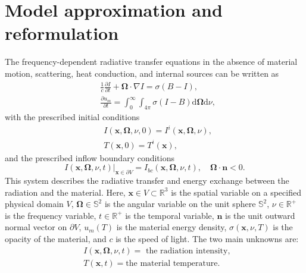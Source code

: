 \documentclass[preprint,12pt]{elsarticle}
\theoremstyle{definition}
\theoremstyle{plain}
\numberwithin{equation}{section}
\numberwithin{algorithm}{section}
\newcounter{eq_count}
\newcounter{subeq_count}
\newcounter{thm_count}
\newcounter{fig_count}
\newcounter{tab_count}
\newcounter{alg_count}
\let\OldSection\section
\renewcommand{\section}{
    \setcounter{eq_count}{0}
    \setcounter{thm_count}{0}
    \setcounter{fig_count}{0}
    \setcounter{tab_count}{0}
    \setcounter{alg_count}{0}
    \OldSection
}
\newcommand{\vOmega}{\mathbf{\Omega}}
\newcommand{\vx}{\mathbf{x}}
\newcommand{\dd}{{\text{d}}}
\newcommand{\pdrv}[2]{\frac{\partial{#1}}{\partial{#2}}}
\begin{document}
\section{Model approximation and reformulation}
\label{sec:model}
The frequency-dependent radiative transfer equations in the absence of material motion, scattering, heat conduction, and internal sources can be written as \cite{larsen2013properties}
\begin{subequations} \label{eq_RTE}
    \begin{align}
        \label{eq:simplified_transfer_intensity}
		&\frac{1}{c} \frac{\partial I}{\partial t}+\vOmega \cdot \nabla I=\sigma (B -I), 
             \\ 
		&\pdrv{u_m}{t}=\int_0^{\infty} \int_{4 \pi} \sigma(I-B) \dd{\vOmega}\dd{\nu},
    \end{align}
\end{subequations}
with the prescribed initial conditions
\begin{subequations}
    \begin{align}
        &I(\vx,\vOmega,\nu,0) = I^{i}(\vx,\vOmega,\nu),
        \\
        &T(\vx,0) = T^{i}(\vx),
    \end{align}
\end{subequations}
and the prescribed inflow boundary conditions
\begin{equation}
    I(\vx,\vOmega,\nu,t)\big|_{\vx \in \partial V} = I_{bc}(\vx,\vOmega,\nu,t),\quad \vOmega\cdot \mathbf{n} < 0.
\end{equation}
This system describes the radiative transfer and energy exchange between the radiation and the material. Here, $\vx \in V \subset \mathbb{R}^{3}$ is the spatial variable on a specified physical domain $V$,  
$\vOmega \in \mathbb{S}^2$ is the angular variable on the unit sphere $\mathbb{S}^2$,  
$\nu \in \mathbb{R}^{+}$ is the frequency variable,  
$t \in \mathbb{R}^{+}$ is the temporal variable,  
$\mathbf{n}$ is the unit outward normal vector on $\partial V$,  
$u_m(T)$ is the material energy density,  
$\sigma(\vx, \nu, T)$ is the opacity of the material, and  
$c$ is the speed of light.
  The two main unknowns are:
\begin{equation*}
    \begin{aligned}
        &I(\vx,\vOmega,\nu,t) =\text { the radiation intensity, }
        \\
        & T(\vx,t) = \text{the material temperature}.
    \end{aligned}
\end{equation*}
\end{document}
